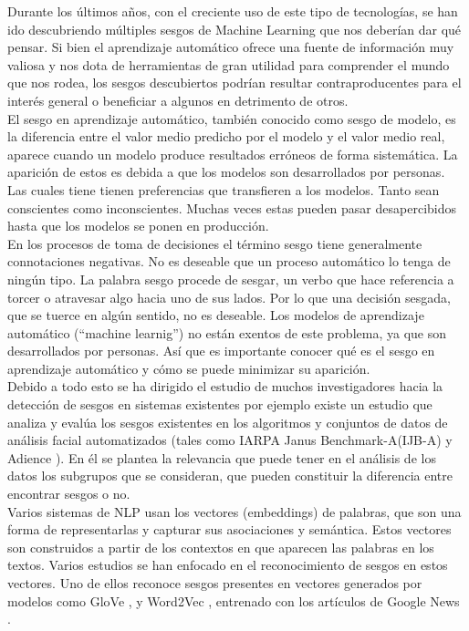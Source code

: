 \documentclass[runningheads,a4paper]{llncs}
\begin{document}
Durante los \'ultimos a\~nos, con el creciente uso de este tipo de tecnolog\'ias, se han ido descubriendo m\'ultiples sesgos de Machine Learning que nos deber\'ian dar qu\'e pensar. Si bien el aprendizaje autom\'atico ofrece una fuente de informaci\'on muy valiosa y nos dota de herramientas de gran utilidad para comprender el mundo que nos rodea, los sesgos descubiertos podr\'ian resultar contraproducentes para el inter\'es general o beneficiar a algunos en detrimento de otros.\\

El sesgo en aprendizaje autom\'atico, tambi\'en conocido como sesgo de modelo, es la diferencia entre el valor medio predicho por el modelo y el valor medio real, aparece cuando un modelo produce resultados err\'oneos de forma sistem\'atica. La aparici\'on de estos es debida a que los modelos son desarrollados por personas. Las cuales tiene tienen preferencias que transfieren a los modelos. Tanto sean conscientes como inconscientes. Muchas veces estas pueden pasar desapercibidos hasta que los modelos se ponen en producci\'on.\\

En los procesos de toma de decisiones el t\'ermino sesgo tiene generalmente connotaciones negativas. No es deseable que un proceso autom\'atico lo tenga de ning\'un tipo. La palabra sesgo procede de sesgar, un verbo que hace referencia a torcer o atravesar algo hacia uno de sus lados. Por lo que una decisi\'on sesgada, que se tuerce en alg\'un sentido, no es deseable. Los modelos de aprendizaje autom\'atico (“machine learnig”) no est\'an exentos de este problema, ya que son desarrollados por personas. As\'i que es importante conocer qu\'e es el sesgo en aprendizaje autom\'atico y c\'omo se puede minimizar su aparici\'on.\\

Debido a todo esto se ha dirigido el estudio de muchos investigadores hacia la detecci\'on de sesgos en sistemas existentes por ejemplo existe un estudio que analiza y eval\'ua los sesgos existentes en los algoritmos y conjuntos de datos de an\'alisis facial automatizados 
(tales como IARPA Janus Benchmark-A(IJB-A) y Adience \cite{Joy}). En \'el se plantea la relevancia que puede tener en el an\'alisis de los datos los subgrupos que se consideran, que pueden constituir la diferencia entre encontrar sesgos o no.\\

Varios sistemas de NLP usan los vectores (embeddings) de palabras, que son una
forma de representarlas y capturar sus asociaciones y sem\'antica. Estos vectores son
construidos a partir de los contextos en que aparecen las palabras en los textos.
Varios estudios se han enfocado en el reconocimiento de sesgos en estos vectores. Uno
de ellos reconoce sesgos presentes en vectores generados por modelos como GloVe \cite{Jef},
y Word2Vec \cite{Tomas}, entrenado con los art\'iculos de Google News \cite{Tolga}.\\
\end{document}
